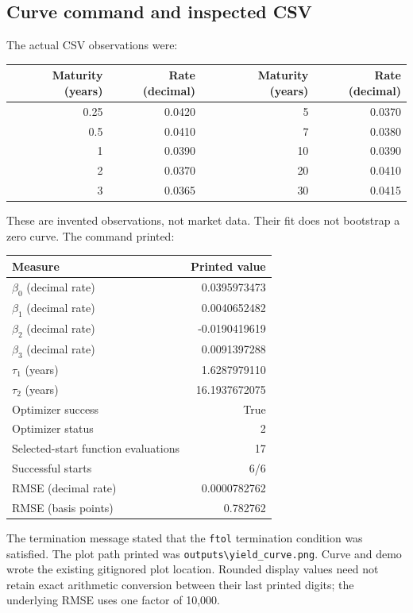 \documentclass[12pt,a4paper]{article}
\begin{document}
\subsection{Curve command and inspected CSV}
The actual CSV observations were:
\begin{center}\small
\begin{tabular}{@{}rrrrr@{}}
\toprule
Maturity (years) & Rate (decimal) && Maturity (years) & Rate (decimal)\\
\midrule
0.25 & 0.0420 && 5 & 0.0370\\
0.5 & 0.0410 && 7 & 0.0380\\
1 & 0.0390 && 10 & 0.0390\\
2 & 0.0370 && 20 & 0.0410\\
3 & 0.0365 && 30 & 0.0415\\
\bottomrule
\end{tabular}
\end{center}
These are invented observations, not market data. Their fit does not
bootstrap a zero curve. The command printed:
\begin{center}
\begin{tabular}{@{}lr@{}}
\toprule
Measure & Printed value\\
\midrule
$\beta_0$ (decimal rate) & 0.0395973473\\
$\beta_1$ (decimal rate) & 0.0040652482\\
$\beta_2$ (decimal rate) & -0.0190419619\\
$\beta_3$ (decimal rate) & 0.0091397288\\
$\tau_1$ (years) & 1.6287979110\\
$\tau_2$ (years) & 16.1937672075\\
Optimizer success & True\\
Optimizer status & 2\\
Selected-start function evaluations & 17\\
Successful starts & 6/6\\
RMSE (decimal rate) & 0.0000782762\\
RMSE (basis points) & 0.782762\\
\bottomrule
\end{tabular}
\end{center}
The termination message stated that the \texttt{ftol} termination
condition was satisfied. The plot path printed was
\texttt{outputs\textbackslash yield\_curve.png}.
Curve and demo wrote the existing gitignored plot location.
Rounded display values need not retain exact arithmetic conversion
between their last printed digits; the underlying RMSE uses one
factor of 10,000.
\end{document}
